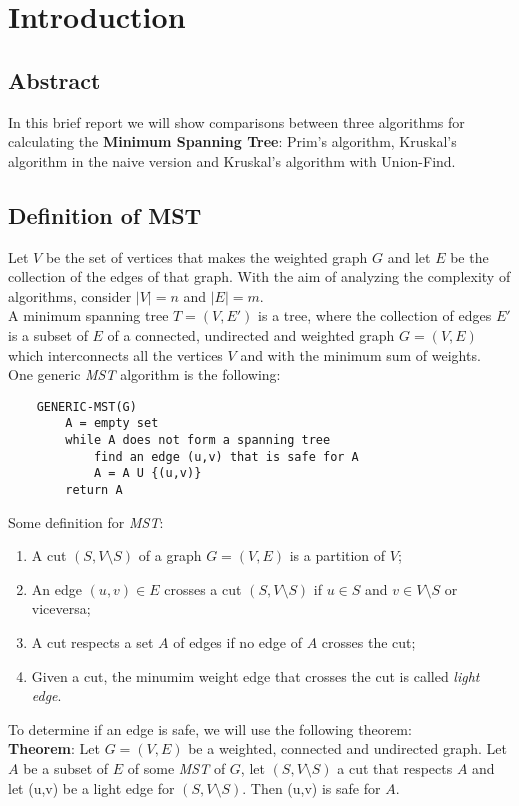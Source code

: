 \section{Introduction}


\subsection{Abstract}
In this brief report we will show comparisons between three algorithms for calculating the \textbf{Minimum Spanning Tree}: Prim's algorithm, Kruskal's algorithm in the naive version and Kruskal's algorithm with Union-Find.

\subsection{Definition of MST}
Let $V$ be the set of vertices that makes the weighted graph $G$ and let $E$ be the collection of the edges of that graph. With the aim of analyzing the complexity of algorithms, consider $|V| = n$ and $|E| = m$. \\
A minimum spanning tree $T = (V,E')$ is a tree, where the collection of edges $E'$ is a subset of $E$ of a connected, undirected and weighted graph $G = (V,E)$ which interconnects all the vertices $V$ and with the minimum sum of weights. \\
\noindent
One generic \textit{MST} algorithm is the following: 
\begin{verbatim}
    GENERIC-MST(G)
        A = empty set
        while A does not form a spanning tree
            find an edge (u,v) that is safe for A
            A = A U {(u,v)}
        return A
\end{verbatim}
\noindent
Some definition for \textit{MST}:
\begin{enumerate}
    \item A cut $(S, V \setminus S)$ of a graph $G = (V, E)$ is a partition of $V$;
    \item An edge $(u,v) \in E$ crosses a cut $(S, V \setminus S)$ if $u\in S$ and $v \in V \setminus S$ or viceversa;
    \item A cut respects a set $A$ of edges if no edge of $A$ crosses the cut;
    \item Given a cut, the minumim weight edge that crosses the cut is called \textit{light edge}.
\end{enumerate}
\noindent
To determine if an edge is safe, we will use the following theorem: \\
\noindent
\textbf{Theorem}: Let $G = (V,E)$ be a weighted, connected and undirected graph. Let $A$ be a subset of $E$ of some \textit{MST} of $G$, let $(S, V \setminus S)$ a cut that respects $A$ and let (u,v) be a light edge for $(S, V \setminus S)$. Then (u,v) is safe for $A$.